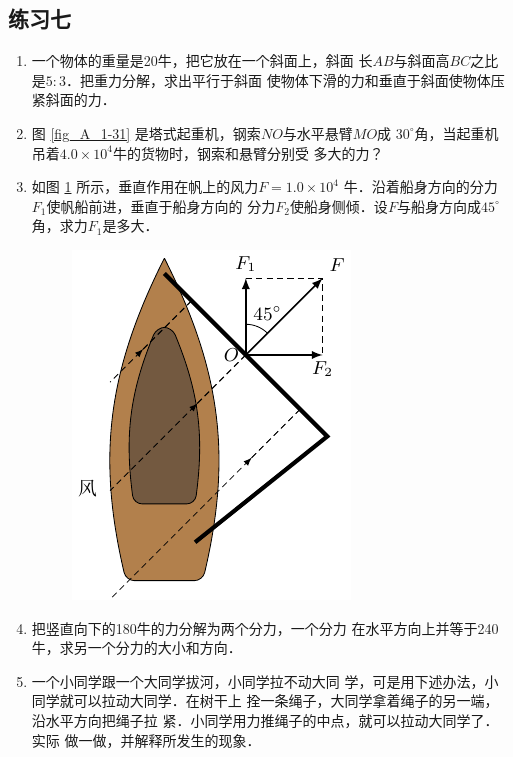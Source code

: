\subsection*{练习七} 
\begin{enumerate} 

\item 一个物体的重量是20牛，把它放在一个斜面上，斜面
长$AB$与斜面高$BC$之比是$5:3$．把重力分解，求出平行于斜面
使物体下滑的力和垂直于斜面使物体压紧斜面的力．
 


\item 图 \ref{fig_A_1-31} 是塔式起重机，钢索$NO$与水平悬臂$MO$成
$30^\circ$角，当起重机吊着$4.0\times 10^4$牛的货物时，钢索和悬臂分别受
多大的力？
\item 如图 \ref{fig_A_1-32} 所示，垂直作用在帆上的风力$F=1.0\times 10^4$
牛．沿着船身方向的分力$F_1$使帆船前进，垂直于船身方向的
分力$F_2$使船身侧倾．设$F$与船身方向成$45^\circ$角，求力$F_1$是多大．
\begin{figure} [htp]
\centering\includegraphics{fig/A/1-32.pdf} 
\caption{} \label{fig_A_1-32} 
\end{figure} 

\item 把竖直向下的180牛的力分解为两个分力，一个分力
在水平方向上并等于240牛，求另一个分力的大小和方向．

\item 一个小同学跟一个大同学拔河，小同学拉不动大同
学，可是用下述办法，小同学就可以拉动大同学．在树干上
拴一条绳子，大同学拿着绳子的另一端，沿水平方向把绳子拉
紧．小同学用力推绳子的中点，就可以拉动大同学了．实际
做一做，并解释所发生的现象．

\end{enumerate} 

